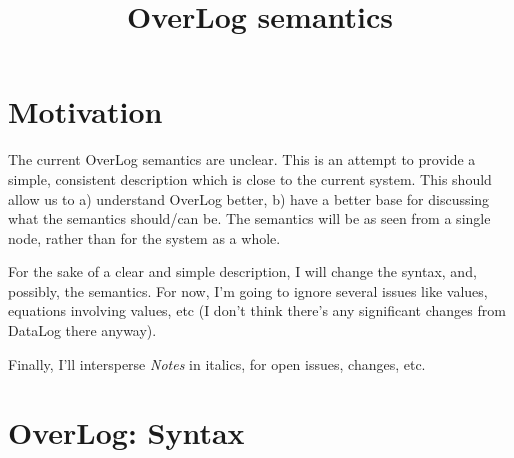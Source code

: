 \documentclass{article}
\begin{document}
\title{OverLog semantics}
\maketitle

\section{Motivation}

The current OverLog semantics are unclear. This is an attempt to provide a
simple, consistent description which is close to the current system. This
should allow us to a) understand OverLog better, b) have a better base for
discussing what the semantics should/can be. The semantics will be as seen
from a single node, rather than for the system as a whole.

For the sake of a clear and simple description, I will change the syntax,
and, possibly, the semantics. For now, I'm going to ignore several issues
like values, equations involving values, etc (I don't think there's any
significant changes from DataLog there anyway).

Finally, I'll intersperse \emph{Notes} in italics, for open issues,
changes, etc.

\section{OverLog: Syntax}
\end{document}
